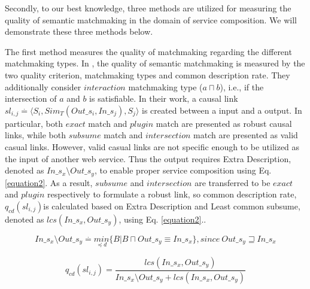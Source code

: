 Secondly, to our best knowledge, three methods  \cite{lecue2007making, pop2009immune,shet2012new} are utilized for measuring the quality of semantic matchmaking in the domain of service composition. We will demonstrate these three methods below.

The first method measures the quality of matchmaking regarding the different matchmaking types. In \cite{lecue2007making}, the quality of semantic matchmaking is measured by the two quality criterion, matchmaking types and common description rate. They additionally consider $interaction$ matchmaking type ($a \sqcap b$), i.e., if the intersection of $a$ and $b$ is satisfiable. In their work, a causal link \begin{math} sl_{i,j} \stackrel{.}{=} \langle S_i, Sim_{T}(Out\_s_i,In\_s_j),S_j  \rangle \end{math} is created between a input and a output. In particular, both $exact$ match and $plugin$ match are presented as robust causal links, while both $subsume$ match and $intersection$ match are presented as valid casual links. However, valid casual links are not specific enough to be utilized as the input of another web service. Thus the output requires Extra Description, denoted as \begin{math} In\_s_x \setminus Out\_s_y \end{math}, to enable proper service composition using Eq. \ref{equation2}. As a result, $subsume$ and $intersection$ are transferred to be $exact$ and $plugin$ respectively to formulate a robust link, so common description rate, \begin{math} q_{cd}(sl_{i,j}) \end{math}is calculated based on Extra Description and Least common subsume, denoted as \begin{math} lcs (In\_s_x, Out\_s_y) \end{math}, using Eq. \ref{equation2}..

\begin{equation}
In\_s_x \setminus Out\_s_y \stackrel{.}{=} \underset {\preceq d}{min} \{ B|B\sqcap  Out\_s_y \equiv In\_s_x  \} , since \  Out\_s_y \sqsupseteq In\_s_x
 \label{equation2}
\end{equation}


\begin{equation}
q_{cd}(sl_{i,j}) = \frac{lcs (In\_s_x, Out\_s_y)} {In\_s_x \setminus Out\_s_y + lcs (In\_s_x, Out\_s_y)}
 \label{equation3}
\end{equation}

